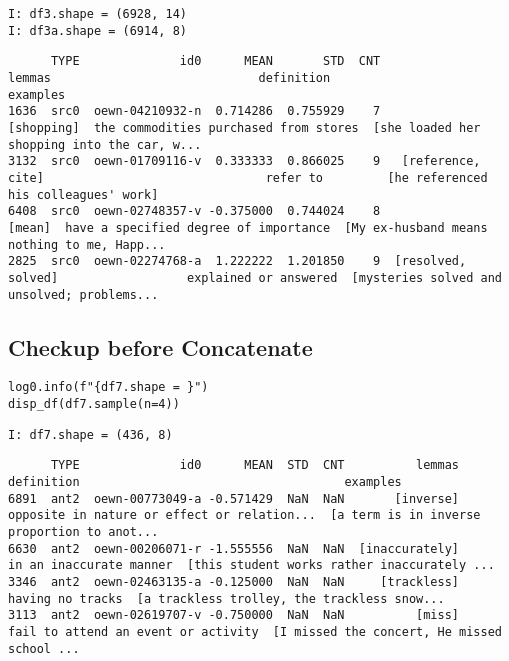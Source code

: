 \documentclass[a4paper,10pt,onecolumn,oneside,openright]{article}
\begin{document}
\begin{verbatim}
I: df3.shape = (6928, 14)
I: df3a.shape = (6914, 8)
\end{verbatim}
\begin{verbatim}
      TYPE              id0      MEAN       STD  CNT              lemmas                             definition                                     examples
1636  src0  oewn-04210932-n  0.714286  0.755929    7          [shopping]  the commodities purchased from stores  [she loaded her shopping into the car, w...
3132  src0  oewn-01709116-v  0.333333  0.866025    9   [reference, cite]                               refer to         [he referenced his colleagues' work]
6408  src0  oewn-02748357-v -0.375000  0.744024    8              [mean]  have a specified degree of importance  [My ex-husband means nothing to me, Happ...
2825  src0  oewn-02274768-a  1.222222  1.201850    9  [resolved, solved]                  explained or answered  [mysteries solved and unsolved; problems...
\end{verbatim}
\subsection{Checkup before Concatenate}
\label{sec:org832758f}
\begin{verbatim}
log0.info(f"{df7.shape = }")
disp_df(df7.sample(n=4))
\end{verbatim}

\begin{verbatim}
I: df7.shape = (436, 8)
\end{verbatim}

\begin{verbatim}
      TYPE              id0      MEAN  STD  CNT          lemmas                                   definition                                     examples
6891  ant2  oewn-00773049-a -0.571429  NaN  NaN       [inverse]  opposite in nature or effect or relation...  [a term is in inverse proportion to anot...
6630  ant2  oewn-00206071-r -1.555556  NaN  NaN  [inaccurately]                      in an inaccurate manner  [this student works rather inaccurately ...
3346  ant2  oewn-02463135-a -0.125000  NaN  NaN     [trackless]                             having no tracks  [a trackless trolley, the trackless snow...
3113  ant2  oewn-02619707-v -0.750000  NaN  NaN          [miss]          fail to attend an event or activity  [I missed the concert, He missed school ...
\end{verbatim}
\end{document}
